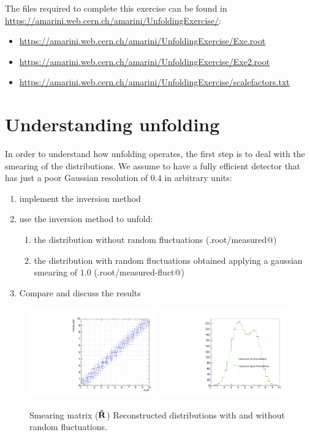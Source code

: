 \documentclass[a4paper,11pt]{article}
\begin{document}
The files required to complete this exercise can be found in \url{https://amarini.web.cern.ch/amarini/UnfoldingExercise/}:
\begin{itemize}
	\item \url{https://amarini.web.cern.ch/amarini/UnfoldingExercise/Exe.root}
	\item \url{https://amarini.web.cern.ch/amarini/UnfoldingExercise/Exe2.root}
	\item \url{https://amarini.web.cern.ch/amarini/UnfoldingExercise/scalefactors.txt}
\end{itemize}

\section{Understanding unfolding}

In order to understand how unfolding operates, the first step is to deal with the smearing of the distributions.
We assume to have a fully efficient detector that has just a poor Gaussian resolution of $0.4$ in arbitrary units:
\begin{enumerate}
	\item implement the inversion method 
	\item use the inversion method to unfold:
	\begin{enumerate}
		\item the distribution without random fluctuations (\verb@Exe.root/measured@)
		\item the distribution with random fluctuations obtained applying a gaussian smearing of $1.0$ (\verb@Exe.root/measured-fluct@)
	\end{enumerate}
	\item Compare and discuss the results
\end{enumerate}
\begin{figure}[H]
	\includegraphics[width=0.49\textwidth]{figs/respt.pdf}
	\includegraphics[width=0.49\textwidth]{figs/reco.pdf}
	\caption{
		\label{fig:exe1}
		\Left{} Smearing matrix ($\mathbf{\tilde{R}}$) 
		\Right{} Reconstructed distributions with and without random fluctuations.
	}	
\end{figure}
\FloatBarrier
\end{document}
